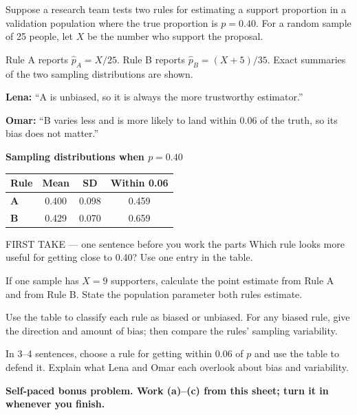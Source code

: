 \documentclass[14pt]{extarticle}
\begin{document}
\pagestyle{empty}


\noindent\begin{minipage}[t]{0.57\linewidth}
\vspace{0pt}
Suppose a research team tests two rules for estimating a support proportion in a validation population where the true proportion is $p=0.40$. For a random sample of 25 people, let $X$ be the number who support the proposal.\par\smallskip Rule A reports $\widehat p_A=X/25$. Rule B reports $\widehat p_B=(X+5)/35$. Exact summaries of the two sampling distributions are shown.\par\smallskip \textbf{Lena:} ``A is unbiased, so it is always the more trustworthy estimator.''\par \textbf{Omar:} ``B varies less and is more likely to land within 0.06 of the truth, so its bias does not matter.''\par
\end{minipage}\hfill
\begin{minipage}[t]{0.40\linewidth}
\vspace{0pt}
\begin{center}
\textbf{Sampling distributions when $p=0.40$}\par\smallskip
\begin{tabular}{|l|c|c|c|}
\hline
\textbf{Rule} & \textbf{Mean} & \textbf{SD} & \textbf{Within 0.06} \\ \hline
\textbf{A} & 0.400 & 0.098 & 0.459 \\ \hline
\textbf{B} & 0.429 & 0.070 & 0.659 \\ \hline
\end{tabular}
\end{center}
\end{minipage}

\begin{firsttakebox}{FIRST TAKE --- one sentence before you work the parts}
Which rule looks more useful for getting close to 0.40? Use one entry in the table.
\end{firsttakebox}

\begin{description}[leftmargin=1.15in, labelwidth=1in, itemsep=2pt, topsep=2pt]
  \item[\dokbadge{1}~(a)] If one sample has $X=9$ supporters, calculate the point estimate from Rule A and from Rule B. State the population parameter both rules estimate.
  \item[\dokbadge{2}~(b)] Use the table to classify each rule as biased or unbiased. For any biased rule, give the direction and amount of bias; then compare the rules' sampling variability.
  \item[\dokbadge{3}~(c)] In 3--4 sentences, choose a rule for getting within 0.06 of $p$ and use the table to defend it. Explain what Lena and Omar each overlook about bias and variability.
\end{description}

\vfill
\textbf{Self-paced bonus problem. Work (a)--(c) from this sheet; turn it in whenever you finish.}
\end{document}
